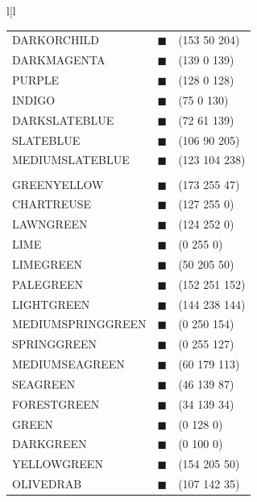 \begin{table}[t]
{\begin{center}
\begin{tabular}{l|l}
\begin{tabular}{lll}
DARKORCHILD				& {\color[RGB]{153,50,204}$\blacksquare$}	& (153 50 204)	\\
DARKMAGENTA				& {\color[RGB]{139,0,139}$\blacksquare$}	& (139 0 139)	\\
PURPLE					& {\color[RGB]{128,0,128}$\blacksquare$}	& (128 0 128)	\\
INDIGO					& {\color[RGB]{75,0,130}$\blacksquare$}	& (75 0 130)	\\
DARKSLATEBLUE			& {\color[RGB]{72,61,139}$\blacksquare$}	& (72 61 139)	\\
SLATEBLUE				& {\color[RGB]{106,90,205}$\blacksquare$}	& (106 90 205)	\\
MEDIUMSLATEBLUE			& {\color[RGB]{123,104,238}$\blacksquare$}	& (123 104 238)	\\
\\
GREENYELLOW				& {\color[RGB]{173,255,47}$\blacksquare$}	& (173 255 47)	\\
CHARTREUSE				& {\color[RGB]{127,255,0}$\blacksquare$}	& (127 255 0)	\\
LAWNGREEN				& {\color[RGB]{124,252,0}$\blacksquare$}	& (124 252 0)	\\
LIME					& {\color[RGB]{0,255,0}$\blacksquare$}	& (0 255 0)	\\
LIMEGREEN				& {\color[RGB]{50,205,50}$\blacksquare$}	& (50 205 50)	\\
PALEGREEN				& {\color[RGB]{152,251,152}$\blacksquare$}	& (152 251 152)	\\
LIGHTGREEN				& {\color[RGB]{144,238,144}$\blacksquare$}	& (144 238 144)	\\
MEDIUMSPRINGGREEN		& {\color[RGB]{0,250,154}$\blacksquare$}	& (0 250 154)	\\
SPRINGGREEN				& {\color[RGB]{0,255,127}$\blacksquare$}	& (0 255 127)	\\
MEDIUMSEAGREEN			& {\color[RGB]{60,179,113}$\blacksquare$}	& (60 179 113)	\\
SEAGREEN				& {\color[RGB]{46,139,87}$\blacksquare$}	& (46 139 87)	\\
FORESTGREEN				& {\color[RGB]{34,139,34}$\blacksquare$}	& (34 139 34)	\\
GREEN					& {\color[RGB]{0,128,0}$\blacksquare$}	& (0 128 0)	\\
DARKGREEN				& {\color[RGB]{0,100,0}$\blacksquare$}	& (0 100 0)	\\
YELLOWGREEN				& {\color[RGB]{154,205,50}$\blacksquare$}	& (154 205 50)	\\
OLIVEDRAB				& {\color[RGB]{107,142,35}$\blacksquare$}	& (107 142 35)	\\

\end{tabular}
\end{tabular}
\end{center}}
\end{table}
